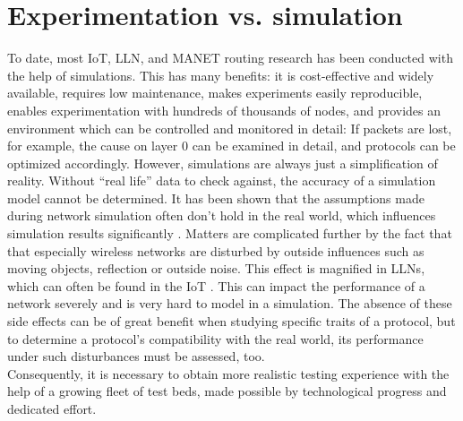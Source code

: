 \documentclass{acm_proc_article-sp}
\begin{document}
\section{Experimentation vs. simulation}
\label{sec:simulation_cons}
To date, most IoT, \gls{LLN}, and \gls{MANET} routing research has been conducted with the help of simulations. This has many benefits: it is cost-effective and widely available, requires low maintenance, makes experiments easily reproducible, enables experimentation with hundreds of thousands of nodes, and provides an environment which can be controlled and monitored in detail: If packets are lost, for example, the cause on layer 0 can be examined in detail, and protocols can be optimized accordingly.
However, simulations are always just a simplification of reality. Without ``real life'' data to check against, the accuracy of a simulation model cannot be determined. It has been shown that the assumptions made during network simulation often don't hold in the real world, which influences simulation results significantly \cite{mistaken-axioms}.
Matters are complicated further by the fact that that especially wireless networks are disturbed by outside influences such as moving objects, reflection or outside noise. This effect is magnified in \glspl{LLN}, which can often be found in the IoT \cite{flex_experimentation}. This can impact the performance of a network severely and is very hard to model in a simulation.
The absence of these side effects can be of great benefit when studying specific traits of a protocol, but to determine a protocol's compatibility with the real world, its performance under such disturbances must be assessed, too.\\
Consequently, it is necessary to obtain more realistic testing experience with the help of a growing fleet of test beds, made possible by technological progress and dedicated effort.
\end{document}
